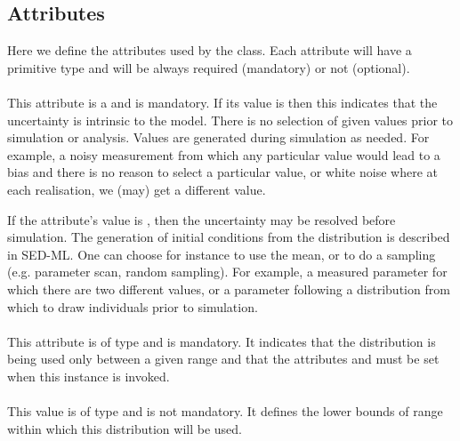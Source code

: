 \documentclass[draftspec]{sbmlpkgspec}
\begin{document}
\subsection{Attributes}

Here we define the attributes used by the \Distribution class. Each
attribute will have a primitive type and will be always required
(mandatory) or not (optional).

\paragraph{}

This attribute is a  and is mandatory. If its value is \value{true}
then this indicates that the uncertainty is intrinsic to the
model. There is no selection of given values prior to simulation or
analysis. Values are generated during simulation as needed. For
example, a noisy measurement from which any particular value would
lead to a bias and there is no reason to select a particular value,
or white noise where at each realisation, we (may) get a different value.

If the attribute's value is \value{false}, then the uncertainty may be
resolved before simulation. The generation of initial conditions from
the distribution is described in SED-ML. One can choose for instance
to use the mean, or to do a sampling (e.g. parameter scan, random
sampling). For example, a measured parameter for which there are two
different values, or a parameter following a distribution from which
to draw individuals prior to simulation.

\paragraph{}

This attribute is of type  and is mandatory. It
indicates that the distribution is being used only between a given
range and that the attributes  and
 must be set when this instance is invoked.

\paragraph{}

This value is of type  and is not mandatory. It
defines the lower bounds of range within which this distribution will
be used.
\end{document}
